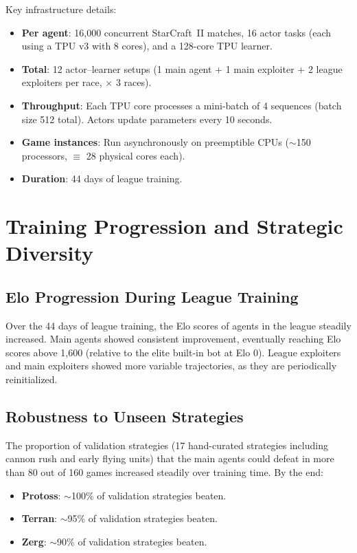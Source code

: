 \documentclass[11pt,a4paper]{article}
\begin{document}
Key infrastructure details:
\begin{itemize}[nosep]
    \item \textbf{Per agent}: 16,000 concurrent StarCraft~II matches, 16 actor tasks (each using a TPU v3 with 8 cores), and a 128-core TPU learner.
    \item \textbf{Total}: 12 actor--learner setups (1 main agent + 1 main exploiter + 2 league exploiters per race, $\times$ 3 races).
    \item \textbf{Throughput}: Each TPU core processes a mini-batch of 4 sequences (batch size 512 total). Actors update parameters every 10 seconds.
    \item \textbf{Game instances}: Run asynchronously on preemptible CPUs ($\sim$150 processors, $\equiv$ 28 physical cores each).
    \item \textbf{Duration}: 44 days of league training.
\end{itemize}

\section{Training Progression and Strategic Diversity}

\subsection{Elo Progression During League Training}

Over the 44 days of league training, the Elo scores of agents in the league steadily increased. Main agents showed consistent improvement, eventually reaching Elo scores above 1,600 (relative to the elite built-in bot at Elo 0). League exploiters and main exploiters showed more variable trajectories, as they are periodically reinitialized.

\subsection{Robustness to Unseen Strategies}

The proportion of validation strategies (17 hand-curated strategies including cannon rush and early flying units) that the main agents could defeat in more than 80 out of 160 games increased steadily over training time. By the end:
\begin{itemize}[nosep]
    \item \textbf{Protoss}: $\sim$100\% of validation strategies beaten.
    \item \textbf{Terran}: $\sim$95\% of validation strategies beaten.
    \item \textbf{Zerg}: $\sim$90\% of validation strategies beaten.
\end{itemize}
\end{document}
